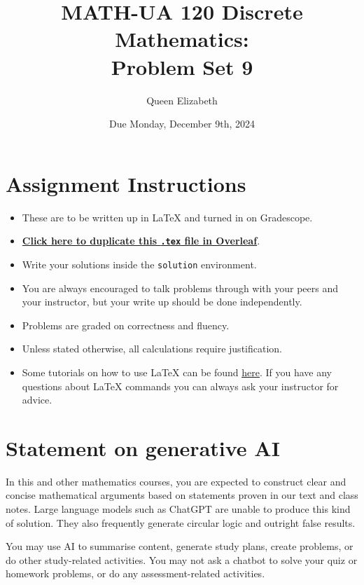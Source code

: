 \documentclass{article}
\title{\textbf{MATH-UA 120 Discrete Mathematics: \\ Problem Set 9}}
\author{%
    Queen Elizabeth %
}
\date{Due Monday, December 9th, 2024} %
\theoremstyle{definition}
\begin{document}
\maketitle %

\vfill

\section*{Assignment Instructions}

\begin{itemize}
    \item These are to be written up in \LaTeX{} and turned in on Gradescope.
    \item \href{https://bit.ly/3yZ1C7Q}{\textbf{Click here to duplicate this \texttt{.tex} file in Overleaf}}.
    \item Write your solutions inside the \texttt{solution} environment.
    \item You are always encouraged to talk problems through with your peers and your instructor, but your write up should be done independently.
    \item Problems are graded on correctness and fluency.
    \item Unless stated otherwise, all calculations require justification.
    \item Some tutorials on how to use \LaTeX{} can be found \href{https://www.overleaf.com/learn/latex/Tutorials}{\underline{here}}. If you have any questions about \LaTeX{} commands you can always ask your instructor for advice.
\end{itemize}

\vfill

\section*{Statement on generative AI}

In this and other mathematics courses, you are expected to construct clear and concise mathematical arguments based on statements proven in our text and class notes. Large language models such as ChatGPT are unable to produce this kind of solution. They also frequently generate circular logic and outright false results.
 
You may use AI to summarise content, generate study plans, create problems, or do other study-related activities. You may not ask a chatbot to solve your quiz or homework problems, or do any assessment-related activities.
 
\end{document}
